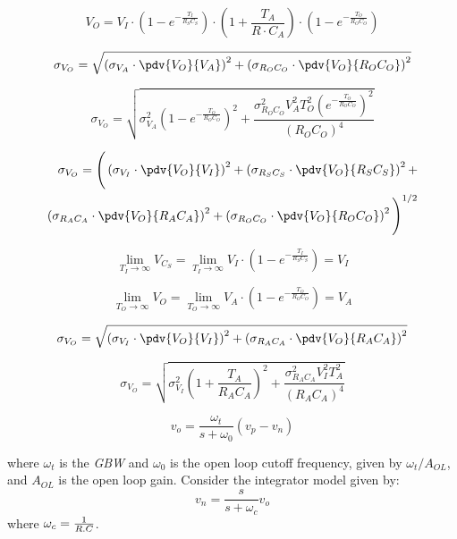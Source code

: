 \begin{equation}
V_O = V_I \cdot \left( 1-{e^{-{\frac {T_I}{R_S C_S}}}} \right)  \cdot \left( 1+\frac{T_A}{R \cdot C_A} \right)\cdot \left( 1-{e^{-{\frac {T_O}{R_O C_O}}}} \right)   
\end{equation}

\begin{equation}
\sigma_{V_O} = \sqrt{\left( \sigma_{V_A} \cdot \pdv{V_O}{V_A} \right)^2 + \left( \sigma_{R_O C_O} \cdot \pdv{V_O}{R_O C_O} \right)^2}
\end{equation}

\begin{equation}
\sigma_{V_O} = \sqrt{ \sigma_{V_A}^2 \left(1-e^{-{\frac{T_O}{R_O C_O}}} \right)^2 + \frac{\sigma_{R_O C_O}^2 V_A^2 T_O^2 \left(e^{-{\frac{T_O}{R_O C_O}}}\right)^2}{(R_O C_O)^4}}
\end{equation}


\begin{equation}
\begin{split}
\sigma_{V_O} = \Bigg(\left( \sigma_{V_I} \cdot \pdv{V_O}{V_I} \right)^2 + \left( \sigma_{R_S C_S} \cdot \pdv{V_O}{R_S C_S} \right)^2 + \\ 
\left( \sigma_{R_A C_A} \cdot \pdv{V_O}{R_A C_A} \right)^2 + \left( \sigma_{R_O C_O} \cdot \pdv{V_O}{R_O C_O} \right)^2 \Bigg)^{1/2}
\end{split}
\end{equation}

\begin{equation}
\lim_{T_I\to\infty} V_{C_S} = \lim_{T_I\to\infty} V_I \cdot \left( 1-{e^{-{\frac {T_I}{R_S C_S}}}} \right) = V_I
\end{equation}

\begin{equation}
\lim_{T_O\to\infty} V_O = \lim_{T_O\to\infty} V_A \cdot \left( 1-{e^{-{\frac {T_O}{R_O C_O}}}} \right) = V_A
\end{equation}

\begin{equation}
\sigma_{V_O} = \sqrt{\left( \sigma_{V_I} \cdot \pdv{V_O}{V_I} \right)^2 + \left( \sigma_{R_A C_A} \cdot \pdv{V_O}{R_A C_A} \right)^2}
\end{equation}

\begin{equation}
\sigma_{V_O} = \sqrt{ \sigma_{V_I}^2 \left(1+{\frac{T_A}{R_A C_A}} \right)^2 + \frac{\sigma_{R_A C_A}^2 V_I^2 T_A^2}{(R_A C_A)^4}}
\end{equation}


\begin{equation}
v_o =\frac{\omega_t }{s+\omega_0 }(v_p -v_n)\label{eq3}
\end{equation}

where $\omega_t$ is the \textit{GBW} and $\omega_0$ is the open loop cutoff frequency, given by $\omega_t /A_{OL}$, and $A_{OL}$ is the open loop gain. Consider the integrator model given by:
\begin{equation}
    v_n =\frac{s}{s+\omega_c }v_o \label{eq4}
\end{equation}
where $\omega_c =\frac{1}{R\ldotp C}$.

